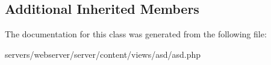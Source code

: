 \subsection*{Additional Inherited Members}


The documentation for this class was generated from the following file\+:\begin{DoxyCompactItemize}
\item 
servers/webserver/server/content/views/asd/asd.\+php\end{DoxyCompactItemize}
